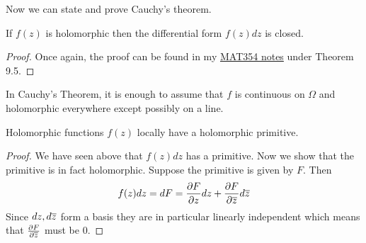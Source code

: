 Now we can state and prove Cauchy's theorem.
\begin{theorem}
    If $f(z)$ is holomorphic then the differential form $f(z) dz$ is closed.
\end{theorem}
\begin{proof}
    Once again, the proof can be found in my \href{http://individual.utoronto.ca/rishibhp/notes/MAT354_notes.pdf}{MAT354 notes} under Theorem 9.5.
\end{proof}
\begin{remark}
In Cauchy's Theorem, it is enough to assume that $f$ is continuous on $\Omega$ and holomorphic everywhere except possibly on a line.
\end{remark}

\begin{corollary}
Holomorphic functions $f(z)$ locally have a holomorphic primitive.
\end{corollary}
\begin{proof}
    We have seen above that $f(z)dz$ has a primitive. Now we show that the primitive is in fact holomorphic. Suppose the primitive is given by $F$. Then
    \begin{align*}
    f(z)dz = dF = \frac{\partial F}{\partial z}dz + \frac{\partial F}{\partial \overline{z}} d\overline{z}
    \end{align*}
    Since $dz, d\overline{z}$ form a basis they are in particular linearly independent which means that $\frac{\partial F}{\partial \overline{z}}$ must be 0.
\end{proof}